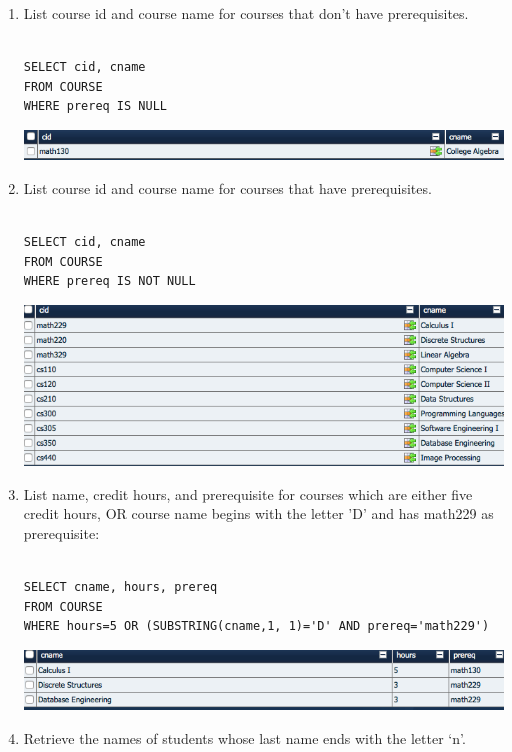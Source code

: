 \documentclass[11pt]{article}
\begin{document}
\begin{enumerate}
\item List course id and course name for courses that don't have prerequisites.

\begin{verbatim}

SELECT cid, cname
FROM COURSE
WHERE prereq IS NULL

\end{verbatim}

\includegraphics[scale=0.5]{17.png}

\item List course id and course name for courses that have prerequisites.

\begin{verbatim}

SELECT cid, cname
FROM COURSE
WHERE prereq IS NOT NULL

\end{verbatim}

\includegraphics[scale=0.5]{18.png}

\item List name, credit hours, and prerequisite for courses which are either five credit hours, OR course name begins with the letter 'D' and has math229 as prerequisite:

\begin{verbatim}

SELECT cname, hours, prereq
FROM COURSE
WHERE hours=5 OR (SUBSTRING(cname,1, 1)='D' AND prereq='math229')

\end{verbatim}

\includegraphics[scale=0.5]{19.png}

\item Retrieve the names of students whose last name ends with the letter `n'.


\end{enumerate}
\end{document}
